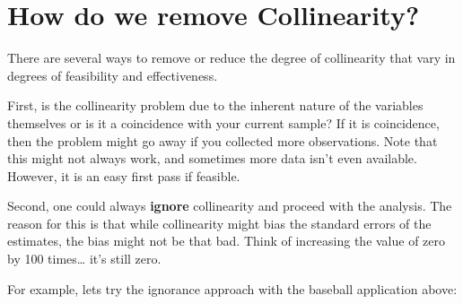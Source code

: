 \documentclass[
]{book}
\begin{document}
\section{How do we remove Collinearity?}\label{how-do-we-remove-collinearity}

There are several ways to remove or reduce the degree of collinearity that vary in degrees of feasibility and effectiveness.

First, is the collinearity problem due to the inherent nature of the variables themselves or is it a coincidence with your current sample? If it is coincidence, then the problem might go away if you collected more observations. Note that this might not always work, and sometimes more data isn't even available. However, it is an easy first pass if feasible.

Second, one could always \textbf{ignore} collinearity and proceed with the analysis. The reason for this is that while collinearity might bias the standard errors of the estimates, the bias might not be that bad. Think of increasing the value of zero by 100 times\ldots{} it's still zero.

For example, lets try the ignorance approach with the baseball application above:
\end{document}

